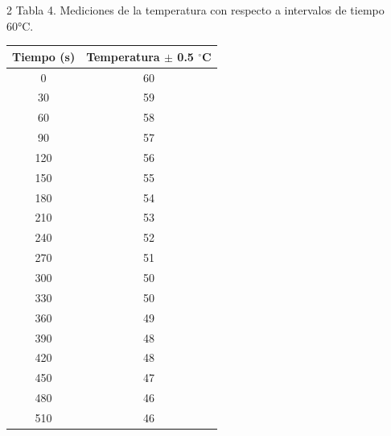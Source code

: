 \documentclass[11pt,letterpaper]{article}
\begin{document}
\begin{multicols}{2}
Tabla 4. Mediciones de la temperatura con respecto a intervalos de tiempo 60°C.\\

\begin{tabular}{|c|c|}
	\hline
	\textbf{Tiempo (s)} & \textbf{Temperatura  $\pm$ 0.5 $^\circ$C}  \\ \hline
	0    & 60  \\ \hline
	30   & 59  \\ \hline
	60   & 58  \\ \hline
	90   & 57  \\ \hline
	120  & 56  \\ \hline
	150  & 55  \\ \hline
	180  & 54  \\ \hline
	210  & 53  \\ \hline
	240  & 52  \\ \hline
	270  & 51  \\ \hline
	300  & 50  \\ \hline
	330  & 50  \\ \hline
	360  & 49  \\ \hline
	390  & 48  \\ \hline
	420  & 48  \\ \hline
	450  & 47  \\ \hline
	480  & 46  \\ \hline
	510  & 46  \\ \hline
\end{tabular}
\end{multicols}
\end{document}
